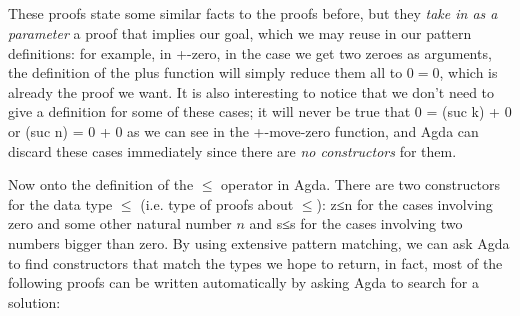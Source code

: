 {\begin{code}
\AgdaOperator{\AgdaPrimitive{+}}\AgdaSpace{}%
\<%
\\
\>[0]\AgdaSpace{}%
\AgdaSpace{}%
\AgdaSpace{}%
\AgdaSpace{}%
\AgdaSymbol{=}\AgdaSpace{}%
\<%
\\
\>[0]\AgdaSpace{}%
\AgdaSpace{}%
\AgdaSymbol{(}\AgdaSpace{}%
\AgdaSymbol{)}\AgdaSpace{}%
\AgdaSymbol{()}\<%
\\
\>[0]\AgdaSpace{}%
\AgdaSymbol{(}\AgdaSpace{}%
\AgdaSymbol{)}\AgdaSpace{}%
\AgdaSpace{}%
\AgdaSymbol{()}\<%
\\
\>[0]\AgdaSpace{}%
\AgdaSymbol{(}\AgdaSpace{}%
\AgdaSymbol{)}\AgdaSpace{}%
\AgdaSymbol{(}\AgdaSpace{}%
\AgdaSpace{}%
\AgdaDottedPattern{\AgdaOperator{\AgdaPrimitive{+}}}\AgdaSpace{}%
\AgdaDottedPattern{\AgdaSymbol{)}}\AgdaSymbol{)}\AgdaSpace{}%
\AgdaSpace{}%
\AgdaSymbol{=}\AgdaSpace{}%
\AgdaSpace{}%
\AgdaSpace{}%
\AgdaSymbol{(}\AgdaSpace{}%
\AgdaSpace{}%
\AgdaSymbol{(}\AgdaSpace{}%
\AgdaOperator{\AgdaPrimitive{+}}\AgdaSpace{}%
\AgdaSymbol{)}\AgdaSpace{}%
\AgdaSymbol{)}\<%
\end{code}

These proofs state some similar facts to the proofs before, but they \emph{take in as a parameter} a proof that implies our goal, which we may reuse in our pattern definitions: for example, in +-zero, in the case we get two zeroes as arguments, the definition of the plus function will simply reduce them all to $0 = 0$, which is already the proof we want. It is also interesting to notice that we don't need to give a definition for some of these cases; it will never be true that 0 = (suc k) + 0 or (suc n) = 0 + 0 as we can see in the +-move-zero function, and Agda can discard these cases immediately since there are \emph{no constructors} for them.

Now onto the definition of the $\le$ operator in Agda. There are two constructors for the data type $\le$ (i.e. type of proofs about $\le$): z≤n for the cases involving zero and some other natural number $n$ and s≤s for the cases involving two numbers bigger than zero. By using extensive pattern matching, we can ask Agda to find constructors that match the types we hope to return, in fact, most of the following proofs can be written automatically by asking Agda to search for a solution:

}
